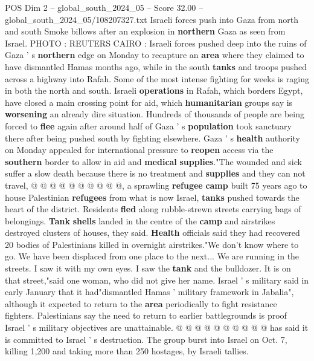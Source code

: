 \begin{textsample}{POS Dim 2 – global\_south\_2024\_05 – Score 32.00 – global\_south\_2024\_05/108207327.txt}  \label{ex:f2_pos_072}
Israeli forces push into Gaza from north and south Smoke billows after an explosion in \textbf{northern} Gaza as seen from Israel.
PHOTO : REUTERS CAIRO : Israeli forces pushed deep into the ruins of Gaza ' s \textbf{northern} edge on Monday to recapture an \textbf{area} where they claimed to have dismantled Hamas months ago, while in the south \textbf{tanks} and troops pushed across a highway into Rafah.
Some of the most intense fighting for weeks is raging in both the north and south.
Israeli \textbf{operations} in Rafah, which borders Egypt, have closed a main crossing point for aid, which \textbf{humanitarian} groups say is \textbf{worsening} an already dire situation.
Hundreds of thousands of people are being forced to \textbf{flee} again after around half of Gaza ' s \textbf{population} took sanctuary there after being pushed south by fighting elsewhere.
Gaza ' s \textbf{health} authority on Monday appealed for international pressure to \textbf{reopen} access via the \textbf{southern} border to allow in aid and \textbf{medical} \textbf{supplies}."The wounded and sick suffer a slow death because there is no treatment and \textbf{supplies} and they can not travel, @ @ @ @ @ @ @ @ @ @, a sprawling \textbf{refugee} \textbf{camp} built 75 years ago to house Palestinian \textbf{refugees} from what is now Israel, \textbf{tanks} pushed towards the heart of the district.
Residents \textbf{fled} along rubble-strewn streets carrying bags of belongings. \textbf{Tank} \textbf{shells} landed in the centre of the \textbf{camp} and airstrikes destroyed clusters of houses, they said. \textbf{Health} officials said they had recovered 20 bodies of Palestinians killed in overnight airstrikes."We don't know where to go.
We have been displaced from one place to the next...
We are running in the streets.
I saw it with my own eyes.
I saw the \textbf{tank} and the bulldozer.
It is on that street,"said one woman, who did not give her name.
Israel ' s military said in early January that it had"dismantled Hamas ' military framework in Jabalia", although it expected to return to the \textbf{area} periodically to fight resistance fighters.
Palestinians say the need to return to earlier battlegrounds is proof Israel ' s military objectives are unattainable. @ @ @ @ @ @ @ @ @ @ has said it is committed to Israel ' s destruction.
The group burst into Israel on Oct. 7, killing 1,200 and taking more than 250 hostages, by Israeli tallies.

\end{textsample}
